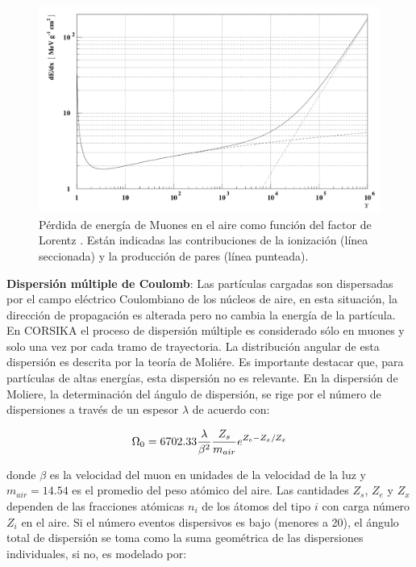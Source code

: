 \begin{figure}[htb!]
        \begin{center}
        \includegraphics[width=1\textwidth]{Figs/Bethe_Muons.png}
        \end{center}
        \caption[Ecuación de Bethe-Bloch para los muones.]{Pérdida de energía de Muones en el aire como función del factor de Lorentz \citep{Heck1998}. Están indicadas las contribuciones de la ionización (línea seccionada) y la producción de pares (línea punteada).}
        \label{fig:fig4}
\end{figure}

\textbf{Dispersión múltiple de Coulomb}: Las partículas cargadas son dispersadas por el campo eléctrico Coulombiano de los núcleos de aire, en esta situación, la dirección de propagación es alterada pero no cambia la energía de la partícula. En CORSIKA el proceso de dispersión múltiple es considerado sólo en muones y solo una vez por cada tramo de trayectoria. La distribución angular de esta dispersión es descrita por la teoría de Moliére. Es importante destacar que, para partículas de altas energías, esta dispersión no es relevante. En la dispersión de Moliere, la determinación del ángulo de dispersión, se rige por el número de dispersiones a través de un espesor $\lambda$ de acuerdo con:

\begin{equation}
\centering
\Omega_{0} = 6702.33 \frac{\lambda}{\beta^{2}} \frac{Z_{s}}{m_{air}}e^{Z_{e}-Z_{x} /Z_{x}}
\label{eq:eq21}
\end{equation}

donde $\beta$ es la velocidad del muon en unidades de la velocidad de la luz y $m_{air} = 14.54$ es el promedio del peso atómico del aire. Las cantidades $Z_{s}$, $Z_{e}$ y $Z_{x}$ dependen de las fracciones atómicas $n_{i}$ de los átomos del tipo $i$ con carga número $Z_{i}$ en el aire. Si el número eventos dispersivos es bajo (menores a 20), el ángulo total de dispersión se toma como la suma geométrica de las dispersiones individuales, si no, es modelado por:

